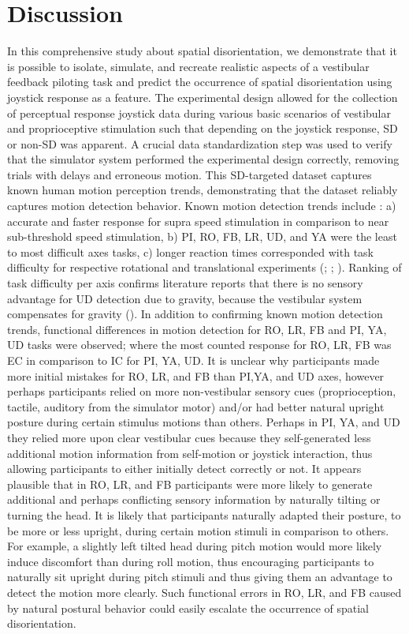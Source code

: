 \documentclass[11pt, onecolumn]{article}
\begin{document}
\section{Discussion}
In this comprehensive study about spatial disorientation, we demonstrate that it is possible to isolate, simulate, and recreate realistic aspects of a vestibular feedback piloting task and predict the occurrence of spatial disorientation using joystick response as a feature.  The experimental design allowed for the collection of perceptual response joystick data during various basic scenarios of vestibular and proprioceptive stimulation such that depending on the joystick response, SD or non-SD was apparent.  A crucial data standardization step was used to verify that the simulator system performed the experimental design correctly, removing trials with delays and erroneous motion.  This SD-targeted dataset captures known human motion perception trends, demonstrating that the dataset reliably captures motion detection behavior.  Known motion detection trends include : a) accurate and faster response for supra speed stimulation in comparison to near sub-threshold speed stimulation, b) PI, RO, FB, LR, UD, and YA were the least to most difficult axes tasks, c) longer reaction times corresponded with task difficulty for respective rotational and translational experiments (\cite{Valko_2012_Vestibular}; \cite{Hartmann_2014_Direction}; \cite{Karmali_2017_Multivariate}).  Ranking of task difficulty per axis confirms literature reports that there is no sensory advantage for UD detection due to gravity, because the vestibular system compensates for gravity (\cite{Valko_2012_Vestibular}).  In addition to confirming known motion detection trends, functional differences in motion detection for RO, LR, FB and PI, YA, UD tasks were observed; where the most counted response for RO, LR, FB was EC in comparison to IC for PI, YA, UD.  It is unclear why participants made more initial mistakes for  RO, LR, and FB than PI,YA, and UD axes, however perhaps participants relied on more non-vestibular sensory cues (proprioception, tactile, auditory from the simulator motor) and/or had better natural upright posture during certain stimulus motions than others.  Perhaps in PI, YA, and UD they relied more upon clear vestibular cues because they self-generated less additional motion information from self-motion or joystick interaction, thus allowing participants to either initially detect correctly or not.  It appears plausible that in RO, LR, and FB participants were more likely to generate additional and perhaps conflicting sensory information by naturally tilting or turning the head.  It is likely that participants naturally adapted their posture, to be more or less upright, during certain motion stimuli in comparison to others.  For example, a slightly left tilted head during pitch motion would more likely induce discomfort than during roll motion, thus encouraging participants to naturally sit upright during pitch stimuli and thus giving them an advantage to detect the motion more clearly.  Such functional errors in RO, LR, and FB caused by natural postural behavior could easily escalate the occurrence of spatial disorientation.
\end{document}
